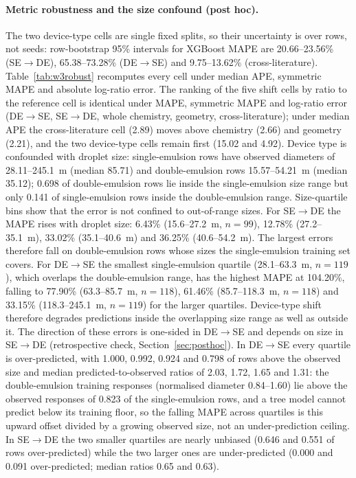 \documentclass[11pt,a4paper]{article}
\newcommand{\um}{\textmu m}
\begin{document}
\paragraph{Metric robustness and the size confound (post hoc).} The two
device-type cells are single fixed splits, so their uncertainty is over rows,
not seeds: row-bootstrap 95\% intervals for XGBoost MAPE are 20.66--23.56\%
(SE$\to$DE), 65.38--73.28\% (DE$\to$SE) and 9.75--13.62\% (cross-literature).
Table~\ref{tab:w3robust} recomputes every cell under median APE, symmetric
MAPE and absolute log-ratio error. The ranking of the five shift cells by
ratio to the reference cell is identical under MAPE, symmetric MAPE and
log-ratio error (DE$\to$SE, SE$\to$DE, whole chemistry, geometry,
cross-literature); under median APE the cross-literature cell (2.89) moves
above chemistry (2.66) and geometry (2.21), and the two device-type cells
remain first (15.02 and 4.92). Device type is confounded with droplet size:
single-emulsion rows have observed diameters of 28.11--245.1~\um{} (median
85.71) and double-emulsion rows 15.57--54.21~\um{} (median 35.12); 0.698 of
double-emulsion rows lie inside the single-emulsion size range but only 0.141
of single-emulsion rows inside the double-emulsion range. Size-quartile bins
show that the error is not confined to out-of-range sizes. For SE$\to$DE the
MAPE rises with droplet size: 6.43\% (15.6--27.2~\um, $n=99$), 12.78\%
(27.2--35.1~\um), 33.02\% (35.1--40.6~\um) and 36.25\% (40.6--54.2~\um). The largest errors therefore fall on double-emulsion rows whose sizes the
single-emulsion training set covers. For DE$\to$SE the smallest
single-emulsion quartile (28.1--63.3~\um, $n=119$), which overlaps the
double-emulsion range, has the highest MAPE at 104.20\%, falling to 77.90\%
(63.3--85.7~\um, $n=118$), 61.46\% (85.7--118.3~\um, $n=118$) and 33.15\%
(118.3--245.1~\um, $n=119$) for the larger quartiles. Device-type shift therefore
degrades predictions inside the overlapping size range as well as outside
it. The direction of these errors is one-sided in DE$\to$SE and depends on size
in SE$\to$DE (retrospective check,
Section~\ref{sec:posthoc}). In DE$\to$SE every quartile is over-predicted,
with 1.000, 0.992, 0.924 and 0.798 of rows above the observed size and median
predicted-to-observed ratios of 2.03, 1.72, 1.65 and 1.31: the
double-emulsion training responses (normalised diameter 0.84--1.60) lie
above the observed responses of 0.823 of the single-emulsion rows, and a tree
model cannot predict below its training floor, so the falling MAPE across
quartiles is this upward offset divided by a growing observed size, not an
under-prediction ceiling. In SE$\to$DE the two smaller quartiles are nearly
unbiased (0.646 and 0.551 of rows over-predicted) while the two larger ones
are under-predicted (0.000 and 0.091 over-predicted; median ratios 0.65 and
0.63).
\end{document}
